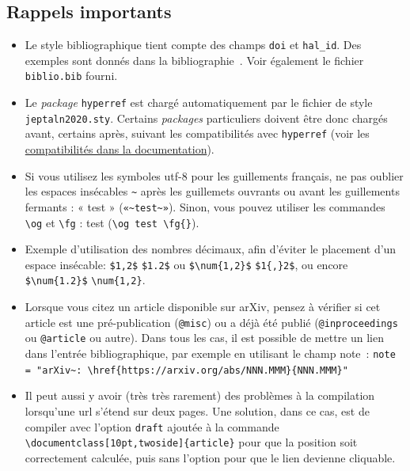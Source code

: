\documentclass[10pt,twoside]{article}
\begin{document}
\subsection{Rappels importants}
  \begin{itemize}
  \item Le style bibliographique tient compte des champs \verb!doi! et \verb!hal_id!. Des exemples sont donnés dans la bibliographie~\cite{pereira-warren:1983,Bernhard07,tellier:2008}. Voir également le fichier \verb!biblio.bib! fourni.
  \item Le \emph{package} \verb!hyperref! est chargé automatiquement par le fichier de style \verb!jeptaln2020.sty!. Certains \emph{packages} particuliers doivent être donc chargés avant, certains après, suivant les compatibilités avec \verb!hyperref! (voir les \href{http://distrib-coffee.ipsl.jussieu.fr/pub/mirrors/ctan/macros/latex/contrib/hyperref/doc/manual.html#x1-520009}{compatibilités dans la documentation}).
    \item Si vous utilisez les symboles utf-8 pour les guillements français, ne
pas oublier les espaces insécables \verb!~! après les guillemets
ouvrants ou avant les guillements fermants : « test »
(\verb!«~test~»!). Sinon, vous pouvez utiliser les commandes
\verb!\og!  et \verb!\fg! : \og test \fg{} (\verb!\og test \fg{}!).
\item Exemple d'utilisation des nombres décimaux, afin d'éviter le
  placement d'un espace insécable: \verb!$1,2$! \verb!$1.2$! ou \verb!$\num{1,2}$! \verb!$1{,}2$!,
  ou encore \verb!$\num{1.2}$! \verb!\num{1,2}!.
\item Lorsque vous citez un article disponible sur arXiv, pensez à
  vérifier si cet article est une pré-publication (\verb!@misc!) ou a
  déjà été publié (\verb!@inproceedings! ou \verb!@article! ou
  autre). Dans tous les cas, il est possible de mettre un lien dans
  l'entrée bibliographique, par exemple en utilisant le champ note~:
  \verb!note = "arXiv~: \href{https://arxiv.org/abs/NNN.MMM}{NNN.MMM}"!
  \item Il peut aussi y avoir (très très rarement) des problèmes à la
    compilation lorsqu'une url s'étend sur deux pages. Une solution,
    dans ce cas, est de compiler avec l'option \verb!draft! ajoutée à
    la commande \verb!\documentclass[10pt,twoside]{article}! pour que
    la position soit correctement calculée, puis sans l'option pour
    que le lien devienne cliquable.
  \end{itemize}
  
\end{document}
